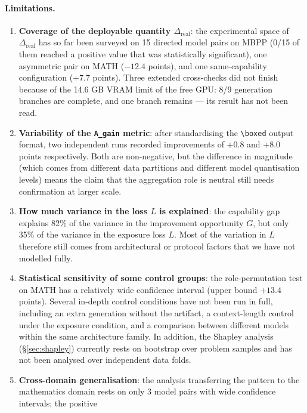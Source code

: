 \documentclass[11pt,a4paper]{article}
\newcommand{\dhonest}{\Delta_{\mathrm{real}}}
\begin{document}
\paragraph{Limitations.}
\begin{enumerate}\itemsep2pt
\item \textbf{Coverage of the deployable quantity $\dhonest$}: the experimental space of $\dhonest$
      has so far been surveyed on 15 directed model pairs on MBPP (0/15 of them reached a positive
      value that was statistically significant), one asymmetric pair on MATH ($-12.4$ points), and
      one same-capability configuration ($+7.7$ points). Three extended cross-checks did not finish
      because of the 14.6 GB VRAM limit of the free GPU: 8/9 generation branches are complete, and
      one branch remains --- its result has not been read.
\item \textbf{Variability of the \texttt{A\_gain} metric}: after standardising the \verb|\boxed|
      output format, two independent runs recorded improvements of $+0.8$ and $+8.0$ points
      respectively. Both are non-negative, but the difference in magnitude (which comes from
      different data partitions and different model quantisation levels) means the claim that the
      aggregation role is neutral still needs confirmation at larger scale.
\item \textbf{How much variance in the loss $L$ is explained}: the capability gap explains 82\% of
      the variance in the improvement opportunity $G$, but only 35\% of the variance in the exposure
      loss $L$. Most of the variation in $L$ therefore still comes from architectural or protocol
      factors that we have not modelled fully.
\item \textbf{Statistical sensitivity of some control groups}: the role-permutation test on MATH has
      a relatively wide confidence interval (upper bound $+13.4$ points). Several in-depth control
      conditions have not been run in full, including an extra generation without the artifact, a
      context-length control under the exposure condition, and a comparison between different models
      within the same architecture family. In addition, the Shapley analysis (\S\ref{sec:shapley})
      currently rests on bootstrap over problem samples and has not been analysed over independent
      data folds.
\item \textbf{Cross-domain generalisation}: the analysis transferring the pattern to the
      mathematics domain rests on only 3 model pairs with wide confidence intervals; the positive

\end{enumerate}
\end{document}
